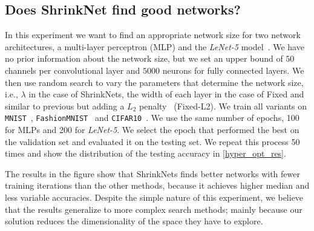 \documentclass[sigconf]{acmart}
\begin{document}
\subsection{Does ShrinkNet find good networks?}

In this experiment we want to find an appropriate network size for two network
architectures, a multi-layer perceptron (MLP) and the \textit{LeNet-5}
model~\cite{Lecun1998}. We have no prior information about the network size,
but we set an upper bound of $50$ channels per convolutional layer and $5000$
neurons for fully connected layers. We then use random search to vary the
parameters that determine the network size, i.e., $\lambda$ in the case of
ShrinkNets, the width of each layer in the case of
\textsf{Fixed} and similar to previous but adding a $L_2$ penalty~\cite{Ng2004}
(\textsf{Fixed-L2}).  We train all variants on \texttt{MNIST}~\cite{Lecun1998},
\texttt{FashionMNIST}~\cite{Xiao2017} and
\texttt{CIFAR10}~\cite{Krizhevsky2009}. We use the same number of epochs, 100
for MLPs and 200 for \textit{LeNet-5}. We select the epoch that performed the
best on the validation set and evaluated it on the testing set. We repeat this
process 50 times and show the distribution of the testing accuracy in
\autoref{hyper_opt_res}.

The results in the figure show that ShrinkNets finds better networks with fewer
training iterations than the other methods, because it achieves higher median 
and less variable accuracies. Despite the simple nature of this experiment, we
believe that the results generalize to more complex search methods; mainly
because our solution reduces the dimensionality of the space they have to
explore.

%
\end{document}
